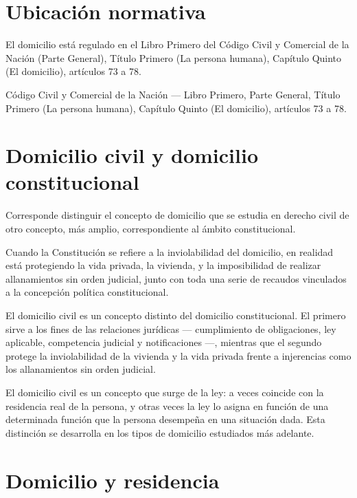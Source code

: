 \documentclass[12pt,oneside]{book}
\begin{document}
\section{Ubicación normativa}

El domicilio está regulado en el Libro Primero del Código Civil y Comercial de la Nación (Parte General), Título Primero (La persona humana), Capítulo Quinto (El domicilio), artículos 73 a 78.

\begin{note}
Código Civil y Comercial de la Nación --- Libro Primero, Parte General, Título Primero (La persona humana), Capítulo Quinto (El domicilio), artículos 73 a 78.
\end{note}

\section{Domicilio civil y domicilio constitucional}

Corresponde distinguir el concepto de domicilio que se estudia en derecho civil de otro concepto, más amplio, correspondiente al ámbito constitucional.

Cuando la Constitución se refiere a la inviolabilidad del domicilio, en realidad está protegiendo la vida privada, la vivienda, y la imposibilidad de realizar allanamientos sin orden judicial, junto con toda una serie de recaudos vinculados a la concepción política constitucional.

\begin{important}
El domicilio civil es un concepto distinto del domicilio constitucional. El primero sirve a los fines de las relaciones jurídicas --- cumplimiento de obligaciones, ley aplicable, competencia judicial y notificaciones ---, mientras que el segundo protege la inviolabilidad de la vivienda y la vida privada frente a injerencias como los allanamientos sin orden judicial.
\end{important}

El domicilio civil es un concepto que surge de la ley: a veces coincide con la residencia real de la persona, y otras veces la ley lo asigna en función de una determinada función que la persona desempeña en una situación dada. Esta distinción se desarrolla en los tipos de domicilio estudiados más adelante.

\section{Domicilio y residencia}
\end{document}
